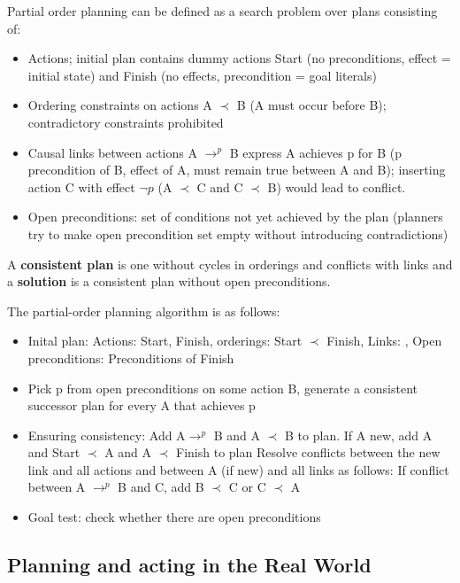 \documentclass{article}
\begin{document}
Partial order planning can be defined as a search problem over plans consisting of:
\begin{itemize}
    \item Actions; initial plan contains dummy actions Start (no preconditions, effect  = initial state) and Finish (no effects, precondition = goal literals)
    \item Ordering constraints on actions A $\prec$ B (A must occur before B); contradictory constraints prohibited 
    \item Causal links between actions A $\rightarrow^p $ B express A achieves p for B (p precondition of B, effect of A, must remain true between A and B); inserting action C with effect $\neg p$ (A $\prec$ C and C $\prec$ B) would lead to conflict.
    \item Open preconditions: set of conditions not yet achieved by the plan (planners try to make open precondition set empty without introducing contradictions)
\end{itemize}

A \textbf{consistent plan} is one without cycles in orderings and conflicts with links and a \textbf{solution} is a consistent plan without open preconditions. 

The partial-order planning algorithm is as follows:
\begin{itemize}
    \item Inital plan: Actions: {Start, Finish}, orderings: {Start $\prec$ Finish},
          Links: {}, Open preconditions: Preconditions of Finish
    \item Pick p from open preconditions on some action B, generate a consistent successor plan for every A that achieves p
    \item Ensuring consistency:
            Add A$\rightarrow^p$ B and A $\prec$ B to plan. If A new, add A and Start $\prec$ A and A $\prec$ Finish to plan
            Resolve conflicts between the new link and all actions and between A (if new) and all links as follows: If conflict between A $\rightarrow^p$ B and C, add B $\prec$ C or C $\prec$ A
    \item Goal test: check whether there are open preconditions
\end{itemize}



\subsection{Planning and acting in the Real World}
\end{document}
